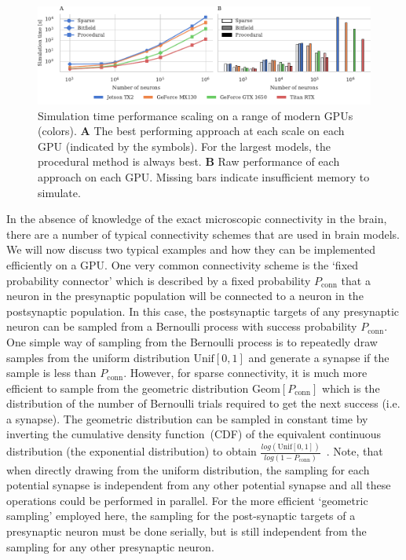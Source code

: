 \documentclass[9pt,twocolumn,twoside,lineno]{pnas-new}
\begin{document}
\begin{figure}
    \centering
    \includegraphics{figures/performance_scaling}
    \caption{Simulation time performance scaling on a range of modern GPUs (colors). \textbf{A} The best performing approach at each scale on each GPU (indicated by the symbols). For the largest models, the procedural method is always best.
    \textbf{B} Raw performance of each approach on each GPU.
    Missing bars indicate insufficient memory to simulate.}
    \label{fig:performance_scaling}
\end{figure}

In the absence of knowledge of the exact microscopic connectivity in the brain, there are a number of typical connectivity schemes that are used in brain models.
We will now discuss two typical examples and how they can be implemented efficiently on a GPU.
One very common connectivity scheme is the `fixed probability connector' which is described by a fixed probability $P_{\text{conn}}$ that a neuron in the presynaptic population will be connected to a neuron in the postsynaptic population.
In this case, the postsynaptic targets of any presynaptic neuron can be sampled from a Bernoulli process with success probability $P_{\text{conn}}$.
One simple way of sampling from the Bernoulli process is to repeatedly draw samples from the uniform distribution $\text{Unif}[0, 1]$ and generate a synapse if the sample is less than $P_{\text{conn}}$.
However, for sparse connectivity, it is much more efficient to sample from the geometric distribution $\text{Geom}[P_{\text{conn}}]$ which is the distribution of the number of Bernoulli trials required to get the next success (i.e. a synapse).
The geometric distribution can be sampled in constant time by inverting the cumulative density function~(CDF) of the equivalent continuous distribution (the exponential distribution) to obtain $\frac{log(\text{Unif}[0, 1])}{log(1 - P_{\text{conn}})}$~\citep[p499]{DevroyeLuc2013}.
Note, that when directly drawing from the uniform distribution, the sampling for each potential synapse is independent from any other potential synapse and all these operations could be performed in parallel.
For the more efficient `geometric sampling' employed here, the sampling for the post-synaptic targets of a presynaptic neuron must be done serially, but is still independent from the sampling for any other presynaptic neuron.
\end{document}
